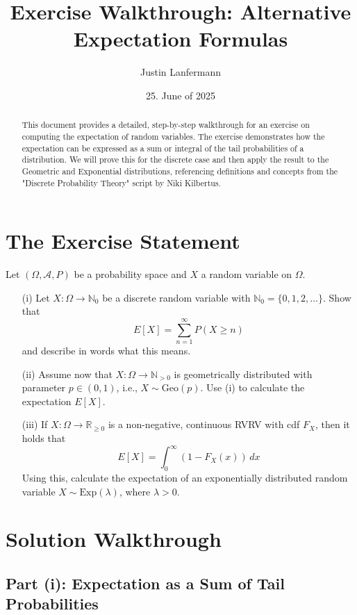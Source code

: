 \documentclass[11pt,a4paper]{article}
\title{Exercise Walkthrough: Alternative Expectation Formulas}
\author{Justin Lanfermann}
\date{25. June of 2025}
\begin{document}
\maketitle

\begin{abstract}
    This document provides a detailed, step-by-step walkthrough for an exercise on computing the expectation of random variables. The exercise demonstrates how the expectation can be expressed as a sum or integral of the tail probabilities of a distribution. We will prove this for the discrete case and then apply the result to the Geometric and Exponential distributions, referencing definitions and concepts from the "Discrete Probability Theory" script by Niki Kilbertus.
\end{abstract}

\section{The Exercise Statement}

Let $(\Omega, \mathcal{A}, P)$ be a probability space and $X$ a random variable on $\Omega$.

\begin{enumerate}
    \item[(i)] Let $X : \Omega \to \mathbb{N}_0$ be a discrete random variable with $\mathbb{N}_0 = \{0, 1, 2, \dots\}$. Show that
    \[
        E[X] = \sum_{n=1}^{\infty} P(X \ge n)
    \]
    and describe in words what this means.
    \item[(ii)] Assume now that $X : \Omega \to \mathbb{N}_{>0}$ is geometrically distributed with parameter $p \in (0,1)$, i.e., $X \sim \text{Geo}(p)$. Use (i) to calculate the expectation $E[X]$.
    \item[(iii)] If $X : \Omega \to \mathbb{R}_{\ge 0}$ is a non-negative, continuous RVRV with cdf $F_X$, then it holds that
    \[
        E[X] = \int_{0}^{\infty} (1 - F_X(x)) \,dx
    \]
    Using this, calculate the expectation of an exponentially distributed random variable $X \sim \text{Exp}(\lambda)$, where $\lambda > 0$.
\end{enumerate}

\section{Solution Walkthrough}

\subsection{Part (i): Expectation as a Sum of Tail Probabilities}
\end{document}
